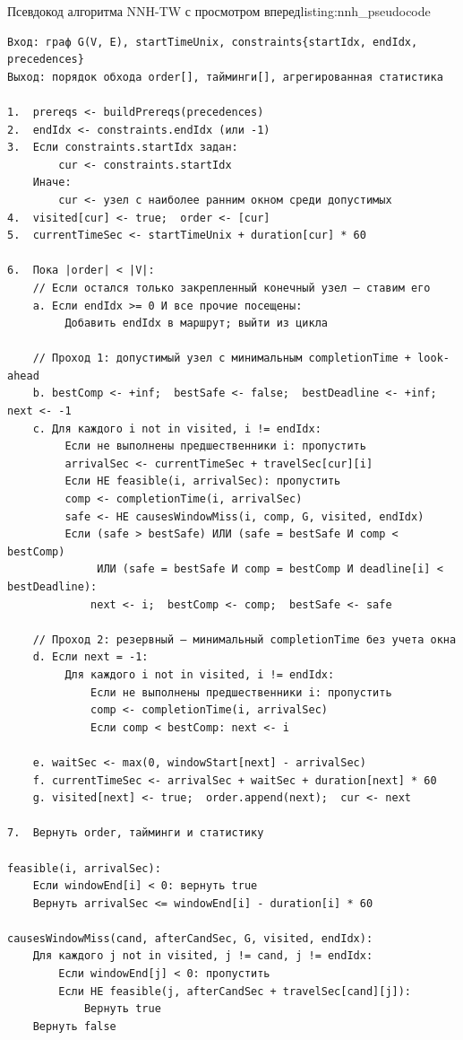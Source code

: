 \begin{codelisting}{Псевдокод алгоритма NNH-TW с просмотром вперед}{listing:nnh_pseudocode}
  \begin{verbatim}
Вход: граф G(V, E), startTimeUnix, constraints{startIdx, endIdx, precedences}
Выход: порядок обхода order[], тайминги[], агрегированная статистика

1.  prereqs <- buildPrereqs(precedences)
2.  endIdx <- constraints.endIdx (или -1)
3.  Если constraints.startIdx задан:
        cur <- constraints.startIdx
    Иначе:
        cur <- узел с наиболее ранним окном среди допустимых
4.  visited[cur] <- true;  order <- [cur]
5.  currentTimeSec <- startTimeUnix + duration[cur] * 60

6.  Пока |order| < |V|:
    // Если остался только закрепленный конечный узел — ставим его
    a. Если endIdx >= 0 И все прочие посещены:
         Добавить endIdx в маршрут; выйти из цикла

    // Проход 1: допустимый узел с минимальным completionTime + look-ahead
    b. bestComp <- +inf;  bestSafe <- false;  bestDeadline <- +inf;  next <- -1
    c. Для каждого i not in visited, i != endIdx:
         Если не выполнены предшественники i: пропустить
         arrivalSec <- currentTimeSec + travelSec[cur][i]
         Если НЕ feasible(i, arrivalSec): пропустить
         comp <- completionTime(i, arrivalSec)
         safe <- НЕ causesWindowMiss(i, comp, G, visited, endIdx)
         Если (safe > bestSafe) ИЛИ (safe = bestSafe И comp < bestComp)
              ИЛИ (safe = bestSafe И comp = bestComp И deadline[i] < bestDeadline):
             next <- i;  bestComp <- comp;  bestSafe <- safe

    // Проход 2: резервный — минимальный completionTime без учета окна
    d. Если next = -1:
         Для каждого i not in visited, i != endIdx:
             Если не выполнены предшественники i: пропустить
             comp <- completionTime(i, arrivalSec)
             Если comp < bestComp: next <- i

    e. waitSec <- max(0, windowStart[next] - arrivalSec)
    f. currentTimeSec <- arrivalSec + waitSec + duration[next] * 60
    g. visited[next] <- true;  order.append(next);  cur <- next

7.  Вернуть order, тайминги и статистику

feasible(i, arrivalSec):
    Если windowEnd[i] < 0: вернуть true
    Вернуть arrivalSec <= windowEnd[i] - duration[i] * 60

causesWindowMiss(cand, afterCandSec, G, visited, endIdx):
    Для каждого j not in visited, j != cand, j != endIdx:
        Если windowEnd[j] < 0: пропустить
        Если НЕ feasible(j, afterCandSec + travelSec[cand][j]):
            Вернуть true
    Вернуть false
  \end{verbatim}
\end{codelisting}

